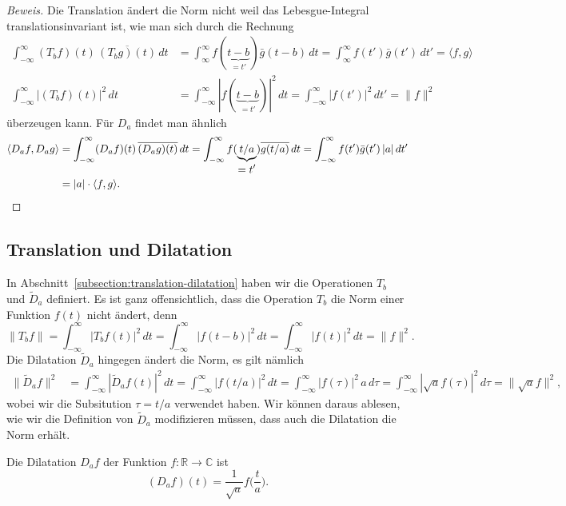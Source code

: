 \begin{proof}[Beweis]
Die Translation ändert die Norm nicht weil das Lebesgue-Integral 
translationsinvariant ist, wie man sich durch die Rechnung
\begin{align*}
\int_{-\infty}^\infty (T_bf)(t)\,\overline{(T_bg)(t)}\,dt
&=
\int_{\infty}^\infty f(\underbrace{t-b}_{\displaystyle=t'})\bar{g}(t-b)\,dt
=
\int_{\infty}^\infty f(t')\bar{g}(t')\,dt'
=
\langle f,g\rangle
\\
\int_{-\infty}^\infty |(T_bf)(t)|^2\,dt
&=
\int_{-\infty}^\infty |f(\underbrace{t-b}_{\displaystyle=t'})|^2\,dt
=
\int_{-\infty}^\infty |f(t')|^2\,dt'
=
\|f\|^2
\end{align*}
überzeugen kann.
Für $D_a$ findet man ähnlich
\begin{align*}
\langle D_af,D_ag\rangle
&=
\int_{-\infty}^\infty (D_af)(t)\,\overline{(D_ag)(t)}\,dt
=
\int_{-\infty}^\infty
f(\underbrace{t/a}_{\displaystyle=t'})
\overline{g(t/a)}
\,dt
=
\int_{-\infty}^\infty f(t')\bar{g}(t')\,|a|\,dt'
\\
&=
|a|\cdot \langle f,g\rangle.
\qedhere
\end{align*}
\end{proof}

\subsection{Translation und Dilatation
\label{subsection:translation-dilatation2}}
In Abschnitt~\ref{subsection:translation-dilatation} haben wir die
Operationen $T_b$ und $\tilde{D}_a$ definiert.
Es ist ganz offensichtlich, dass die Operation $T_b$ die Norm einer
Funktion $f(t)$ nicht ändert, denn
\[
\|T_bf\|
=
\int_{-\infty}^{\infty} |T_bf(t)|^2\,dt
=
\int_{-\infty}^{\infty} |f(t-b)|^2\,dt
=
\int_{-\infty}^{\infty} |f(t)|^2\,dt
=
\|f\|^2.
\]
Die Dilatation $\tilde{D}_a$ hingegen ändert die Norm, es gilt nämlich
\begin{align*}
\|\tilde{D}_af\|^2
&=
\int_{-\infty}^\infty |\tilde{D}_af(t)|^2\,dt
=
\int_{-\infty}^\infty |f(t/a)|^2 \,dt
=
\int_{-\infty}^\infty |f(\tau)|^2 \, a\,d\tau
=
\int_{-\infty}^\infty |\sqrt{a} f(\tau)|^2 \,d\tau
=
\| \sqrt{a} f \|^2,
\end{align*}
wobei wir die Subsitution $\tau = t/a$ verwendet haben.
Wir können daraus ablesen, wie wir die Definition von $\tilde{D}_a$
modifizieren müssen, dass auch die Dilatation die Norm erhält.

\begin{definition}
Die Dilatation $D_af$ der Funktion $f\colon\mathbb R\to\mathbb C$ ist 
\[
(D_af)(t) = \frac{1}{\sqrt{a}} f\biggl(\frac{t}{a}\biggr).
\]
\end{definition}

